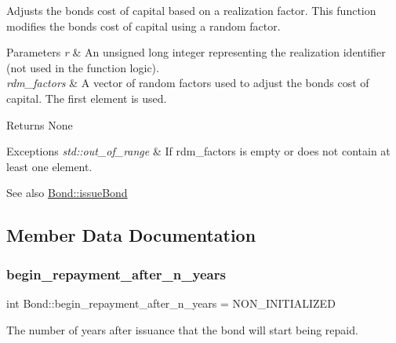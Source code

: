 Adjusts the bond\textquotesingle{}s cost of capital based on a realization factor. This function modifies the bond\textquotesingle{}s cost of capital using a random factor. 


\begin{DoxyParams}{Parameters}
{\em r} & An unsigned long integer representing the realization identifier (not used in the function logic). \\
\hline
{\em rdm\+\_\+factors} & A vector of random factors used to adjust the bond\textquotesingle{}s cost of capital. The first element is used.\\
\hline
\end{DoxyParams}
\begin{DoxyReturn}{Returns}
None
\end{DoxyReturn}

\begin{DoxyExceptions}{Exceptions}
{\em std\+::out\+\_\+of\+\_\+range} & If {\ttfamily rdm\+\_\+factors} is empty or does not contain at least one element.\\
\hline
\end{DoxyExceptions}
\begin{DoxySeeAlso}{See also}
\mbox{\hyperlink{classBond_a726edbe3ea7047ebc7246585943763e3}{Bond\+::issue\+Bond}} 
\end{DoxySeeAlso}


\subsection{Member Data Documentation}
\mbox{\label{classBond_a8d808753f9708e841dfceca72a110737}} 
\subsubsection{\texorpdfstring{begin\+\_\+repayment\+\_\+after\+\_\+n\+\_\+years}{begin\_repayment\_after\_n\_years}}
{\footnotesize\ttfamily int Bond\+::begin\+\_\+repayment\+\_\+after\+\_\+n\+\_\+years = N\+O\+N\+\_\+\+I\+N\+I\+T\+I\+A\+L\+I\+Z\+ED\hspace{0.3cm}{\ttfamily [protected]}}



The number of years after issuance that the bond will start being repaid. 

